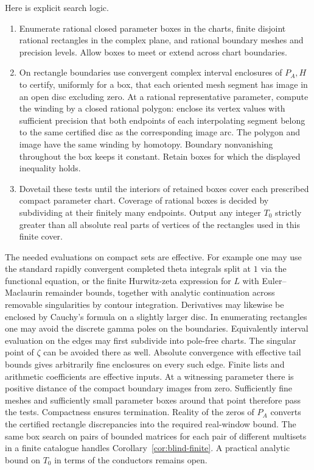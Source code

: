 \documentclass[11pt]{article}
\theoremstyle{remark}\newtheorem{remark}[theorem]{Remark}
\begin{document}
Here is explicit search logic.
\begin{enumerate}
\item Enumerate rational closed parameter boxes in the charts, finite disjoint rational rectangles in the complex plane, and rational boundary meshes and precision levels. Allow boxes to meet or extend across chart boundaries.
\item On rectangle boundaries use convergent complex interval enclosures of $P_A,H$ to certify, uniformly for a box, that each oriented mesh segment has image in an open disc excluding zero. At a rational representative parameter, compute the winding by a closed rational polygon: enclose its vertex values with sufficient precision that both endpoints of each interpolating segment belong to the same certified disc as the corresponding image arc. The polygon and image have the same winding by homotopy. Boundary nonvanishing throughout the box keeps it constant. Retain boxes for which the displayed inequality holds.
\item Dovetail these tests until the interiors of retained boxes cover each prescribed compact parameter chart. Coverage of rational boxes is decided by subdividing at their finitely many endpoints. Output any integer $T_0$ strictly greater than all absolute real parts of vertices of the rectangles used in this finite cover.
\end{enumerate}
The needed evaluations on compact sets are effective. For example one may use the standard rapidly convergent completed theta integrals split at $1$ via the functional equation, or the finite Hurwitz-zeta expression for $L$ with Euler--Maclaurin remainder bounds, together with analytic continuation across removable singularities by contour integration. Derivatives may likewise be enclosed by Cauchy's formula on a slightly larger disc. In enumerating rectangles one may avoid the discrete gamma poles on the boundaries. Equivalently interval evaluation on the edges may first subdivide into pole-free charts. The singular point of $\zeta$ can be avoided there as well. Absolute convergence with effective tail bounds gives arbitrarily fine enclosures on every such edge. Finite lists and arithmetic coefficients are effective inputs. At a witnessing parameter there is positive distance of the compact boundary images from zero. Sufficiently fine meshes and sufficiently small parameter boxes around that point therefore pass the tests. Compactness ensures termination. Reality of the zeros of $P_A$ converts the certified rectangle discrepancies into the required real-window bound. The same box search on pairs of bounded matrices for each pair of different multisets in a finite catalogue handles Corollary~\ref{cor:blind-finite}. A practical analytic bound on $T_0$ in terms of the conductors remains open.
\end{document}
